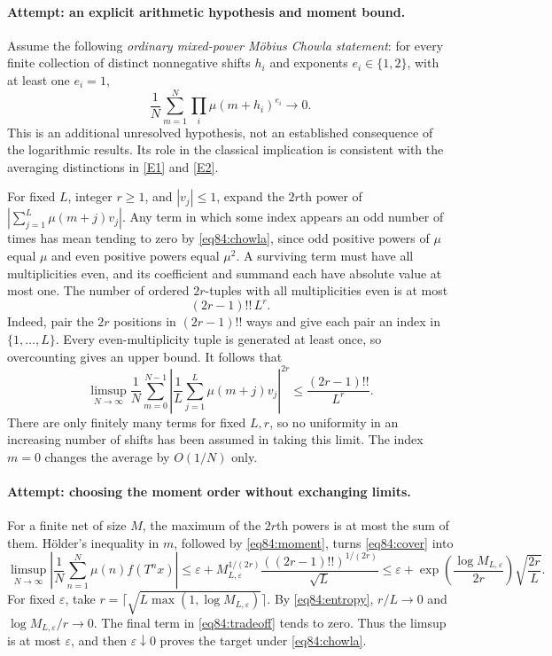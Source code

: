 \documentclass[11pt,a4paper]{article}
\numberwithin{equation}{section}
\newcommand{\eref}[2]{\hyperlink{extra:#1:#2}{[E#2]}}
\begin{document}
\paragraph{Attempt: an explicit arithmetic hypothesis and moment bound.}
Assume the following \emph{ordinary mixed-power M\"obius Chowla statement}:
for every finite collection of distinct nonnegative shifts $h_i$ and
exponents $e_i\in\{1,2\}$, with at least one $e_i=1$,
\begin{equation}\label{eq84:chowla}
 \frac1N\sum_{m=1}^N\prod_i\mu(m+h_i)^{e_i}\longrightarrow0.
\end{equation}
This is an additional unresolved hypothesis, not an established consequence
of the logarithmic results. Its role in the classical implication is
consistent with the averaging distinctions in \eref{84}{1} and
\eref{84}{2}.

For fixed $L$, integer $r\geq1$, and $|v_j|\leq1$, expand the $2r$th
power of $|\sum_{j=1}^L\mu(m+j)v_j|$. Any term in which some index appears
an odd number of times has mean tending to zero by \eqref{eq84:chowla},
since odd positive powers of $\mu$ equal $\mu$ and even positive powers
equal $\mu^2$. A surviving term must have all multiplicities even, and
its coefficient and summand each have absolute value at most one.
The number of ordered $2r$-tuples with all multiplicities even is at most
\[
 (2r-1)!!\,L^r.
\]
Indeed, pair the $2r$ positions in $(2r-1)!!$ ways and give each pair an
index in $\{1,\ldots,L\}$. Every even-multiplicity tuple is generated at
least once, so overcounting gives an upper bound. It follows that
\begin{equation}\label{eq84:moment}
 \limsup_{N\to\infty}\frac1N\sum_{m=0}^{N-1}
 \left|\frac1L\sum_{j=1}^L\mu(m+j)v_j\right|^{2r}
 \leq\frac{(2r-1)!!}{L^r}.
\end{equation}
There are only finitely many terms for fixed $L,r$, so no uniformity in
an increasing number of shifts has been assumed in taking this limit.
The index $m=0$ changes the average by $O(1/N)$ only.

\paragraph{Attempt: choosing the moment order without exchanging limits.}
For a finite net of size $M$, the maximum of the $2r$th powers is at most
the sum of them. H\"older's inequality in $m$, followed by
\eqref{eq84:moment}, turns \eqref{eq84:cover} into
\begin{equation}\label{eq84:tradeoff}
 \limsup_{N\to\infty}\left|\frac1N\sum_{n=1}^N
                      \mu(n)f(T^nx)\right|
 \leq\varepsilon+
 M_{L,\varepsilon}^{1/(2r)}
       \frac{((2r-1)!!)^{1/(2r)}}{\sqrt L}
 \leq\varepsilon+
 \exp\left(\frac{\log M_{L,\varepsilon}}{2r}\right)
                      \sqrt{\frac{2r}{L}}.
\end{equation}
For fixed $\varepsilon$, take
$r=\lceil\sqrt{L\max(1,\log M_{L,\varepsilon})}\rceil$.
By \eqref{eq84:entropy}, $r/L\to0$ and
$\log M_{L,\varepsilon}/r\to0$. The final term in
\eqref{eq84:tradeoff} tends to zero. Thus the limsup is at most
$\varepsilon$, and then $\varepsilon\downarrow0$ proves the target
under \eqref{eq84:chowla}.
\end{document}
